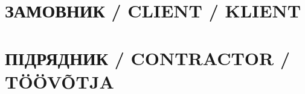 \begin{paracol}{2}
  \section*{ЗАМОВНИК / CLIENT / KLIENT}
  \switchcolumn
  \section*{ПІДРЯДНИК / CONTRACTOR / TÖÖVÕTJA}
\end{paracol}
